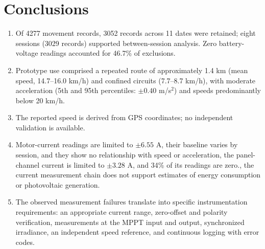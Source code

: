 \documentclass[vehicles,article,submit,moreauthors]{Definitions/mdpi}
\begin{document}
\section{Conclusions}

\begin{enumerate}
    \item Of 4277 movement records, 3052 records across 11 dates were retained; eight sessions (3029 records) supported between-session analysis. Zero battery-voltage readings accounted for 46.7\% of exclusions.
    \item Prototype use comprised a repeated route of approximately 1.4 km (mean speed, 14.7--16.0 km/h) and confined circuits (7.7--8.7 km/h), with moderate acceleration (5th and 95th percentiles: $\pm 0.40$ m/s$^2$) and speeds predominantly below 20 km/h.
    \item The reported speed is derived from GPS coordinates; no independent validation is available.
    \item Motor-current readings are limited to $\pm 6.55$ A, their baseline varies by session, and they show no relationship with speed or acceleration, the panel-channel current is limited to $\pm 3.28$ A, and 34\% of its readings are zero., the current measurement chain does not support estimates of energy consumption or photovoltaic generation.
    \item The observed measurement failures translate into specific instrumentation requirements: an appropriate current range, zero-offset and polarity verification, measurements at the MPPT input and output, synchronized irradiance, an independent speed reference, and continuous logging with error codes.
\end{enumerate}

\end{document}
